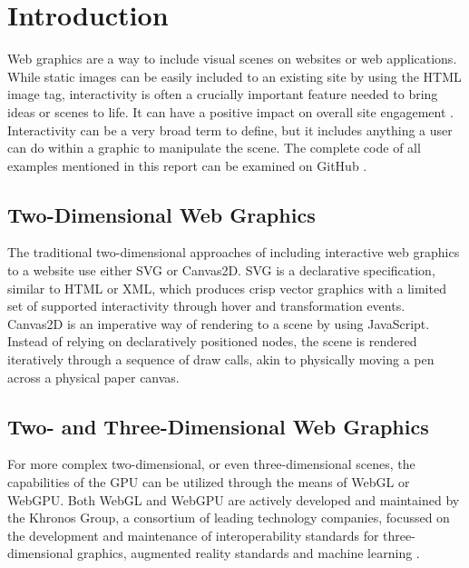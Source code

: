 %
%
%
%


\chapter{Introduction}

\label{chap:Intro}
Web graphics are a way to include visual scenes on websites or web
applications. While static images can be easily included to an existing
site by using the HTML image tag, interactivity is often a crucially
important feature needed to bring ideas or scenes to life. It can have a
positive impact on overall site engagement
\parencite{web-engagement-literature}. Interactivity can be a very broad
term to define, but it includes anything a user can do within a graphic
to manipulate the scene. The complete code of all examples mentioned in
this report can be examined on GitHub \parencite{github-repo}.

\section{Two-Dimensional Web Graphics}
The traditional two-dimensional approaches of including interactive web
graphics to a website use either SVG or Canvas2D. SVG is a declarative
specification, similar to HTML or XML, which produces crisp vector
graphics with a limited set of supported interactivity through hover and
transformation events. Canvas2D is an imperative way of rendering to a
scene by using JavaScript. Instead of relying on declaratively
positioned nodes, the scene is rendered iteratively through a sequence
of draw calls, akin to physically moving a pen across a physical paper
canvas.

\section{Two- and Three-Dimensional Web Graphics}
For more complex two-dimensional, or even three-dimensional scenes, the
capabilities of the GPU can be utilized through the means of WebGL or
WebGPU. Both WebGL and WebGPU are actively developed and maintained by
the Khronos Group, a consortium of leading technology companies,
focussed on the development and maintenance of interoperability
standards for three-dimensional graphics, augmented reality standards
and machine learning \parencite{khronos-web}.

